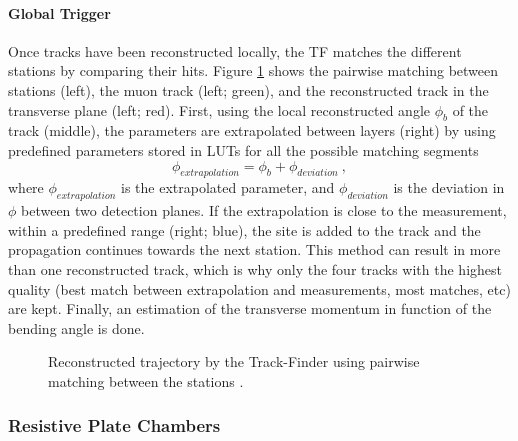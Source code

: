     				\paragraph*{Global Trigger}
    				\label{sec:trigger_system_and_reconstruction_algorithms__global_trigger}

    					Once tracks have been reconstructed locally, the TF matches the different stations by comparing their hits. Figure \ref{fig:trigger_system_and_reconstruction_algorithms__dt_global} shows the pairwise matching between stations (left), the muon track (left; green), and the reconstructed track in the transverse plane (left; red). First, using the local reconstructed angle $ \phi_b $ of the track (middle), the parameters are extrapolated between layers (right) by using predefined parameters stored in LUTs for all the possible matching segments
    					\begin{equation}
    						\phi_{extrapolation} = \phi_b + \phi_{deviation} \ ,
    					\end{equation}
    					where $ \phi_{extrapolation} $ is the extrapolated parameter, and $ \phi_{deviation} $ is the deviation in $ \phi $ between two detection planes. If the extrapolation is close to the measurement, within a predefined range (right; blue), the site is added to the track and the propagation continues towards the next station. This method can result in more than one reconstructed track, which is why only the four tracks with the highest quality (best match between extrapolation and measurements, most matches, etc) are kept. Finally, an estimation of the transverse momentum in function of the bending angle is done.

    					\begin{figure}[h!]
    						\centering
    						\caption{Reconstructed trajectory by the Track-Finder using pairwise matching between the stations \Cite{CMS_at_LHC}.}
    						\label{fig:trigger_system_and_reconstruction_algorithms__dt_global}
    					\end{figure}

    			\subsubsection{Resistive Plate Chambers}
    			\label{sec:trigger_system_and_reconstruction_algorithms__rpc_l1_trigger}

